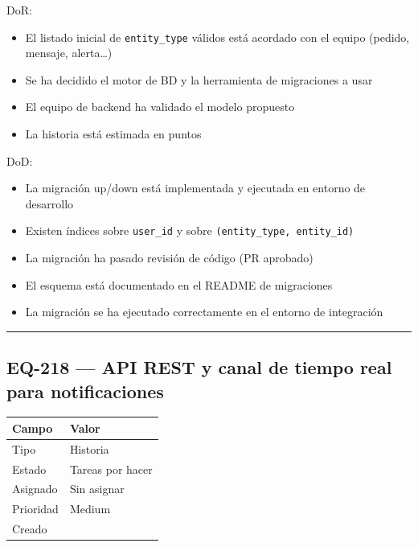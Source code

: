 \documentclass[
  spanish,
  11pt,
]{report}
\newcounter{none} %
\providecommand{\tightlist}{%
  \setlength{\itemsep}{0pt}\setlength{\parskip}{0pt}}
\begin{document}
DoR:

\begin{itemize}
\tightlist
\item
  El listado inicial de \texttt{entity\_type} válidos está acordado con
  el equipo (pedido, mensaje, alerta\ldots)
\item
  Se ha decidido el motor de BD y la herramienta de migraciones a usar
\item
  El equipo de backend ha validado el modelo propuesto
\item
  La historia está estimada en puntos
\end{itemize}

DoD:

\begin{itemize}
\tightlist
\item
  La migración up/down está implementada y ejecutada en entorno de
  desarrollo
\item
  Existen índices sobre \texttt{user\_id} y sobre
  \texttt{(entity\_type,\ entity\_id)}
\item
  La migración ha pasado revisión de código (PR aprobado)
\item
  El esquema está documentado en el README de migraciones
\item
  La migración se ha ejecutado correctamente en el entorno de
  integración
\end{itemize}

\begin{center}\rule{0.5\linewidth}{0.5pt}\end{center}

\subsection{EQ-218 --- API REST y canal de tiempo real para
notificaciones}\label{eq-218-api-rest-y-canal-de-tiempo-real-para-notificaciones}

{\def\LTcaptype{none} %
\begin{longtable}[]{@{}ll@{}}
\toprule\noalign{}
Campo & Valor \\
\midrule\noalign{}
\endhead
\bottomrule\noalign{}
\endlastfoot
Tipo & Historia \\
Estado & Tareas por hacer \\
Asignado & Sin asignar \\
Prioridad & Medium \\
Creado & \\
\end{longtable}
}
\end{document}
